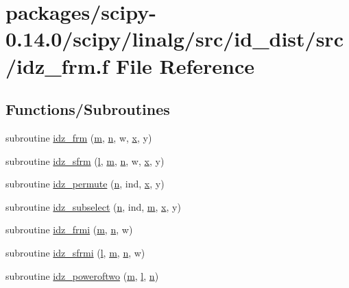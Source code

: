 \hypertarget{idz__frm_8f}{}\section{packages/scipy-\/0.14.0/scipy/linalg/src/id\+\_\+dist/src/idz\+\_\+frm.f File Reference}
\label{idz__frm_8f}
\subsection*{Functions/\+Subroutines}
\begin{DoxyCompactItemize}
\item 
subroutine \hyperlink{idz__frm_8f_a45a786d27f552232efe044640a321b82}{idz\+\_\+frm} (\hyperlink{indexexpr_8h_ab72fdb4031d47b75ab26dd18a437bcdc}{m}, \hyperlink{indexexpr_8h_ab427e2e2b4d6cec55fa088ea2a692ace}{n}, w, \hyperlink{vecnorm1_8cc_ac73eed9e41ec09d58f112f06c2d6cb63}{x}, y)
\item 
subroutine \hyperlink{idz__frm_8f_a793e8a64c4970bdc9e9d9250adfb5af5}{idz\+\_\+sfrm} (\hyperlink{indexexpr_8h_a88aacdaa46b76729743ee33ef8b95a58}{l}, \hyperlink{indexexpr_8h_ab72fdb4031d47b75ab26dd18a437bcdc}{m}, \hyperlink{indexexpr_8h_ab427e2e2b4d6cec55fa088ea2a692ace}{n}, w, \hyperlink{vecnorm1_8cc_ac73eed9e41ec09d58f112f06c2d6cb63}{x}, y)
\item 
subroutine \hyperlink{idz__frm_8f_ad7c0f19eabc957569fbbfd6047ad6fae}{idz\+\_\+permute} (\hyperlink{indexexpr_8h_ab427e2e2b4d6cec55fa088ea2a692ace}{n}, ind, \hyperlink{vecnorm1_8cc_ac73eed9e41ec09d58f112f06c2d6cb63}{x}, y)
\item 
subroutine \hyperlink{idz__frm_8f_ac2f7e3ba089333de3d4ab22f24d850e4}{idz\+\_\+subselect} (\hyperlink{indexexpr_8h_ab427e2e2b4d6cec55fa088ea2a692ace}{n}, ind, \hyperlink{indexexpr_8h_ab72fdb4031d47b75ab26dd18a437bcdc}{m}, \hyperlink{vecnorm1_8cc_ac73eed9e41ec09d58f112f06c2d6cb63}{x}, y)
\item 
subroutine \hyperlink{idz__frm_8f_a6ad75026218c2953fabb449d13c3b6cf}{idz\+\_\+frmi} (\hyperlink{indexexpr_8h_ab72fdb4031d47b75ab26dd18a437bcdc}{m}, \hyperlink{indexexpr_8h_ab427e2e2b4d6cec55fa088ea2a692ace}{n}, w)
\item 
subroutine \hyperlink{idz__frm_8f_ac8ff81b48d152ccc123ee84797fd40f5}{idz\+\_\+sfrmi} (\hyperlink{indexexpr_8h_a88aacdaa46b76729743ee33ef8b95a58}{l}, \hyperlink{indexexpr_8h_ab72fdb4031d47b75ab26dd18a437bcdc}{m}, \hyperlink{indexexpr_8h_ab427e2e2b4d6cec55fa088ea2a692ace}{n}, w)
\item 
subroutine \hyperlink{idz__frm_8f_abf008eed0f063228256846a5492f2fce}{idz\+\_\+poweroftwo} (\hyperlink{indexexpr_8h_ab72fdb4031d47b75ab26dd18a437bcdc}{m}, \hyperlink{indexexpr_8h_a88aacdaa46b76729743ee33ef8b95a58}{l}, \hyperlink{indexexpr_8h_ab427e2e2b4d6cec55fa088ea2a692ace}{n})
\end{DoxyCompactItemize}


